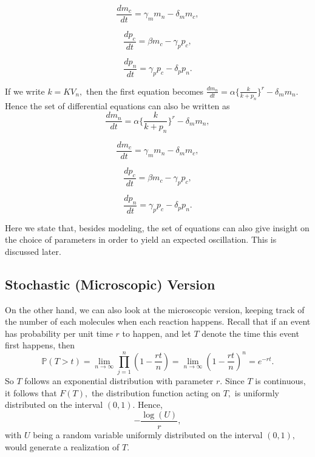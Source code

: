 \documentclass[12pt]{article}
\renewcommand{\(}{\left (}
\renewcommand{\)}{\right )}
\begin{document}
\begin{equation}
	\frac{dm_c}{dt} = \gamma_m m_n - \delta_m m_c,
\end{equation}

\begin{equation}
	\frac{dp_c}{dt} = \beta m_c - \gamma_p p_c,
\end{equation}

\begin{equation}
	\frac{dp_n}{dt} = \gamma_p p_c - \delta_p p_n.
\end{equation}

If we write $k = K V_n,$ then the first equation becomes $\frac{dm_n}{dt} = \alpha \{\frac{k}{k + p_n}\}^r - \delta_m m_n.$ Hence the set of differential equations can also be written as
\begin{equation}
	\frac{dm_n}{dt} = \alpha \{\frac{k}{k + p_n}\}^r - \delta_m m_n,
\end{equation}

\begin{equation}
	\frac{dm_c}{dt} = \gamma_m m_n - \delta_m m_c,
\end{equation}

\begin{equation}
	\frac{dp_c}{dt} = \beta m_c - \gamma_p p_c,
\end{equation}

\begin{equation}
	\frac{dp_n}{dt} = \gamma_p p_c - \delta_p p_n.
\end{equation}

Here we state that, besides modeling, the set of equations can also give insight on the choice of parameters in order to yield an expected oscillation. This is discussed later.


\subsection{Stochastic (Microscopic) Version}
\hspace{5mm} On the other hand, we can also look at the microscopic version, keeping track of the number of each molecules when each reaction happens. Recall that if an event has probability per unit time $r$ to happen, and let $T$ denote the time this event first happens, then
\begin{equation}
	\mathbb{P}(T > t) = \lim_{n \to \infty} \prod_{j=1}^{n} (1-\frac{rt}{n}) = \lim_{n \to \infty} (1 - \frac{rt}{n})^n = e^{-rt}.
\end{equation}
So $T$ follows an exponential distribution with parameter $r.$  Since $T$ is continuous, it follows that $F(T),$ the distribution function acting on $T,$ is uniformly distributed on the interval $(0,1).$ Hence, $$-\frac{\log(U)}{r},$$ with $U$ being a random variable uniformly distributed on the interval $(0,1),$ would generate a realization of $T.$
\end{document}
